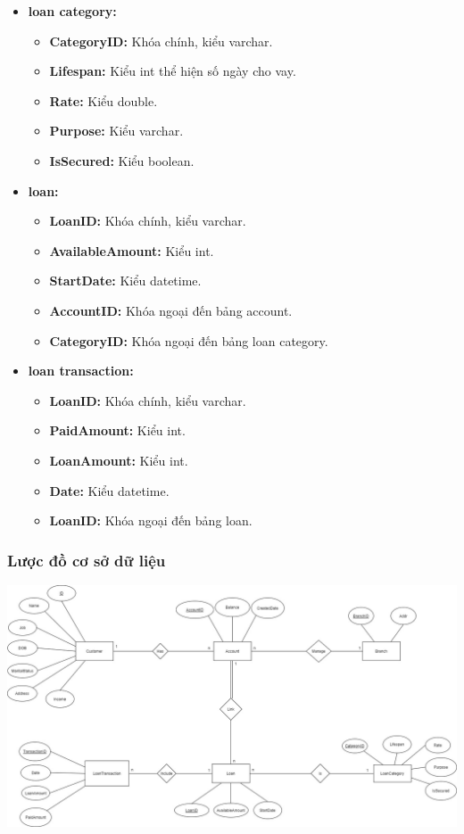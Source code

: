 \documentclass{article}
\begin{document}
\begin{itemize}
    \item \textbf{loan category:}
    \begin{itemize}
        \item \textbf{CategoryID:} Khóa chính, kiểu varchar.
        \item \textbf{Lifespan:} Kiểu int thể hiện số ngày cho vay.
        \item \textbf{Rate:} Kiểu double.
        \item \textbf{Purpose:} Kiểu varchar.
        \item \textbf{IsSecured:} Kiểu boolean.
    \end{itemize}
    
    \item \textbf{loan:}
    \begin{itemize}
        \item \textbf{LoanID:} Khóa chính, kiểu varchar.
        \item \textbf{AvailableAmount:} Kiểu int.
        \item \textbf{StartDate:} Kiểu datetime.
        \item \textbf{AccountID:} Khóa ngoại đến bảng account.
        \item \textbf{CategoryID:} Khóa ngoại đến bảng loan category.
    \end{itemize}
    
    \item \textbf{loan transaction:}
    \begin{itemize}
        \item \textbf{LoanID:} Khóa chính, kiểu varchar.
        \item \textbf{PaidAmount:} Kiểu int.
        \item \textbf{LoanAmount:} Kiểu int.
        \item \textbf{Date:} Kiểu datetime.
        \item \textbf{LoanID:} Khóa ngoại đến bảng loan.
    \end{itemize} 
\end{itemize}
\subsubsection{Lược đồ cơ sở dữ liệu}
\begin{center}
    \includegraphics[scale=0.5]{ERDiagram.jpg}
\end{center}
\end{document}
